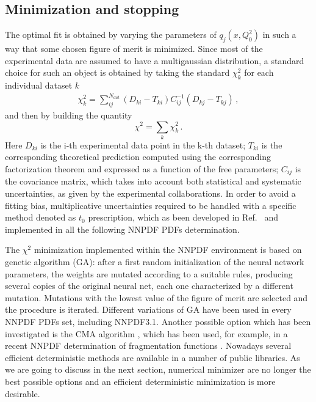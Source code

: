 \subsection{Minimization and stopping}
\label{sec:minimization}
The optimal fit is obtained by varying the parameters of $q_j\left(x,Q_0^2\right)$  in such a way that 
some chosen figure of merit is minimized. 
Since most of the experimental data are assumed to have a multigaussian
distribution, a standard choice for such an object is obtained by taking the standard $\chi^2_k $ for each individual 
dataset $k$
\begin{align}
    \label{eq:chi2}
    \chi^2_k 
    =\sum_{ij}^{N_{dat}}\left(D_{ki}-T_{ki}\right)C_{ij}^{-1}\left(D_{kj}-T_{kj}\right)\,,
\end{align}
and then by building the quantity
\begin{equation}
\label{tot chi2}
\chi^2=\sum_k \chi^2_k\,.
\end{equation}
Here $D_{ki}$ is the i-th experimental data point in the k-th dataset; $T_{ki}$ is the corresponding 
theoretical prediction computed using the corresponding factorization theorem and 
expressed as a function of the free parameters; 
$C_{ij}$ is the covariance matrix, which takes into account both statistical and systematic uncertainties,
as given by the experimental collaborations.
In order to avoid a fitting bias, multiplicative uncertainties required to be handled with a specific method
denoted as $t_0$ prescription, which as been developed in Ref.~\cite{Ball:2009qv} and implemented in all the following
NNPDF PDFs determination.

%
The $\chi^2$ minimization implemented within the NNPDF environment is based on genetic algorithm (GA):
after a first random initialization of the neural network parameters,
the weights are mutated according to a suitable rules, producing
several copies of the original neural net, each one characterized by a different mutation.
Mutations with the lowest value of the figure of merit are selected and the procedure is iterated.
Different variations of GA have been used in every NNPDF PDFs set, including NNPDF3.1.
Another possible option which has been investigated is the CMA algorithm \cite{DBLP:journals/corr/Hansen16a},
which has been used, for example, in a recent NNPDF determination of 
fragmentation functions \cite{Bertone:2017tyb}. 
Nowadays several efficient deterministic methods are available in a number of public libraries.
As we are going to discuss in the next section, numerical minimizer are no longer the best possible options
and an efficient deterministic minimization is more desirable. 

